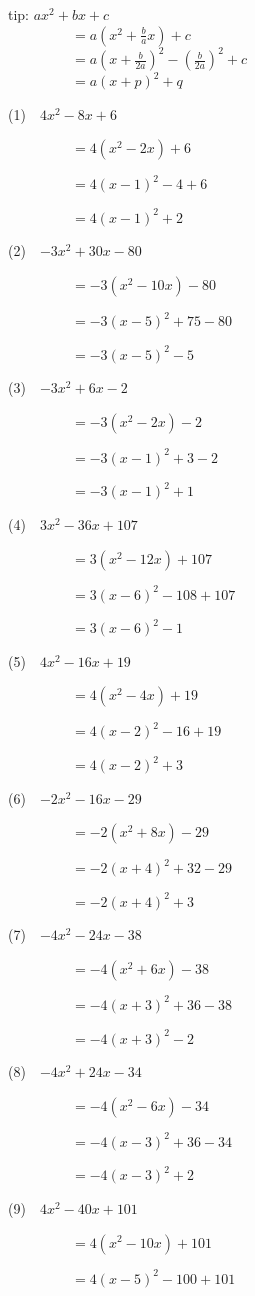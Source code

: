 \documentclass[a4j,twocolumn,10pt,fleqn]{jarticle}
\begin{document}
tip: $ax^2 + bx + c$\\ 
~~~~~~~~~$= a(x^2 + \frac{b}{a}x) + c$\\ 
~~~~~~~~~$= a(x + \frac{b}{2a})^2 - \left(\frac{b}{2a}\right)^2+ c$\\ 
~~~~~~~~~$= a(x + p)^2 + q$


(1)~~$4x^2-8x +6$

~~~~~~~~~$=4(x^2-2x) +6$

~~~~~~~~~$=4(x-1)^2-4+6$

~~~~~~~~~$=4(x-1)^2 +2$

(2)~~$-3x^2 +30x-80$

~~~~~~~~~$=-3(x^2-10x)-80$

~~~~~~~~~$=-3(x-5)^2 +75-80$

~~~~~~~~~$=-3(x-5)^2-5$

(3)~~$-3x^2 +6x-2$

~~~~~~~~~$=-3(x^2-2x)-2$

~~~~~~~~~$=-3(x-1)^2 +3-2$

~~~~~~~~~$=-3(x-1)^2 +1$

(4)~~$3x^2-36x +107$

~~~~~~~~~$=3(x^2-12x) +107$

~~~~~~~~~$=3(x-6)^2-108+107$

~~~~~~~~~$=3(x-6)^2-1$

(5)~~$4x^2-16x +19$

~~~~~~~~~$=4(x^2-4x) +19$

~~~~~~~~~$=4(x-2)^2-16+19$

~~~~~~~~~$=4(x-2)^2 +3$

(6)~~$-2x^2-16x-29$

~~~~~~~~~$=-2(x^2 +8x)-29$

~~~~~~~~~$=-2(x +4)^2 +32-29$

~~~~~~~~~$=-2(x +4)^2 +3$

(7)~~$-4x^2-24x-38$

~~~~~~~~~$=-4(x^2 +6x)-38$

~~~~~~~~~$=-4(x +3)^2 +36-38$

~~~~~~~~~$=-4(x +3)^2-2$

(8)~~$-4x^2 +24x-34$

~~~~~~~~~$=-4(x^2-6x)-34$

~~~~~~~~~$=-4(x-3)^2 +36-34$

~~~~~~~~~$=-4(x-3)^2 +2$

(9)~~$4x^2-40x +101$

~~~~~~~~~$=4(x^2-10x) +101$

~~~~~~~~~$=4(x-5)^2-100+101$
\end{document}

